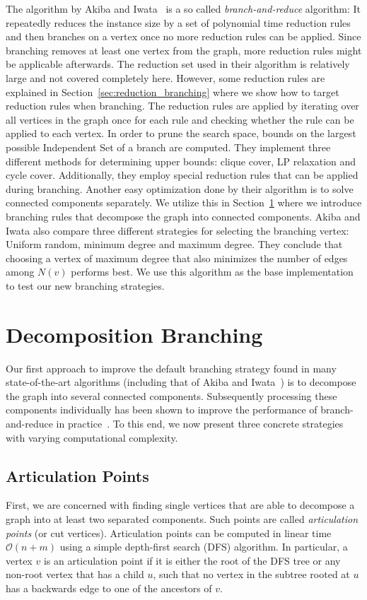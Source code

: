 \documentclass[a4paper,UKenglish,cleveref, autoref, thm-restate]{lipics-v2021}
\begin{document}
The algorithm by Akiba and Iwata~\cite{AkibaIwata} is a so called
\emph{branch-and-reduce} algorithm: It repeatedly reduces the instance size by a
set of polynomial time reduction rules and then branches on a vertex once no
more reduction rules can be applied. Since branching removes at least one vertex
from the graph, more reduction rules might be applicable afterwards. The
reduction set used in their algorithm is relatively large and not covered
completely here. However, some reduction rules are explained in
Section~\ref{sec:reduction_branching} where we show how to target reduction
rules when branching. The reduction rules are applied by iterating over all
vertices in the graph once for each rule and checking whether the rule
can be applied to each vertex. In order to prune the search space, bounds on the largest
possible Independent Set of a branch are computed. They implement three different
methods for determining upper bounds: clique cover, LP relaxation and cycle
cover. Additionally, they employ special reduction rules that can be applied
during branching. Another easy optimization done by their algorithm is to solve
connected components separately. We utilize this in
Section~\ref{sec:decomposition_branching} where we introduce branching rules
that decompose the graph into connected components. Akiba and Iwata also
compare three different strategies for
selecting the branching vertex: Uniform random, minimum degree and maximum
degree. They conclude that choosing a vertex of maximum degree that also
minimizes the number of edges among $N(v)$ performs best. We use this algorithm
as the base implementation to test our new branching strategies.

\section{Decomposition Branching}
\label{sec:decomposition_branching}
Our first approach to improve the default branching strategy found in many state-of-the-art algorithms (including that of Akiba and Iwata~\cite{AkibaIwata}) is to decompose the graph into several connected components.
Subsequently processing these components individually has been shown to improve the performance of branch-and-reduce in practice~\cite{alsahafy2020computing}.
To this end, we now present three concrete strategies with varying computational complexity.

\subsection{Articulation Points}
First, we are concerned with finding single vertices that are able to decompose a graph into at least two separated components.
Such points are called \emph{articulation points} (or cut vertices).
Articulation points can be computed in linear time $\mathcal{O}(n+m)$ using a simple depth-first search (DFS) algorithm.
In particular, a vertex $v$ is an articulation point if it is either the root of
the DFS tree or any non-root vertex that has a child $u$, such that no vertex in
the subtree rooted at $u$ has a backwards edge to one of the ancestors of
$v$.
\end{document}
